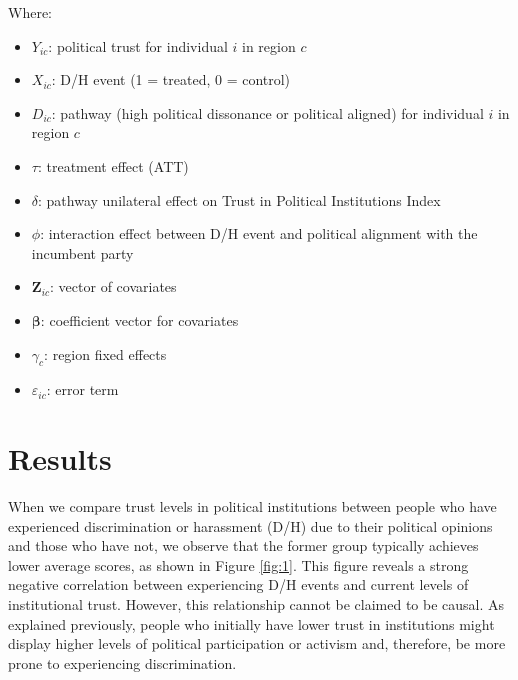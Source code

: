 \documentclass{article}
\begin{document}
  Where:
  \begin{itemize}
    \item \( Y_{ic} \): political trust for individual \( i \) in region \( c \)
    \item \( X_{ic} \): D/H event (1 = treated, 0 = control)
    \item \( D_{ic} \): pathway (high political dissonance or political aligned) for individual \( i \) in region \( c \)
    \item \( \tau \): treatment effect (ATT)
    \item \( \delta \): pathway unilateral effect on Trust in Political Institutions Index
    \item \( \phi \): interaction effect between D/H event and political alignment with the incumbent party
    \item \( \mathbf{Z}_{ic} \): vector of covariates
    \item \( \mathbf{\beta} \): coefficient vector for covariates
    \item \( \gamma_c \): region fixed effects
    \item \( \varepsilon_{ic} \): error term
  \end{itemize}

\section{Results}

When we compare trust levels in political institutions between people who have experienced discrimination or harassment (D/H) due to their political opinions and those who have not, we observe that the former group typically achieves lower average scores, as shown in Figure \ref{fig:1}. This figure reveals a strong negative correlation between experiencing D/H events and current levels of institutional trust. However, this relationship cannot be claimed to be causal. As explained previously, people who initially have lower trust in institutions might display higher levels of political participation or activism and, therefore, be more prone to experiencing discrimination.
\end{document}
